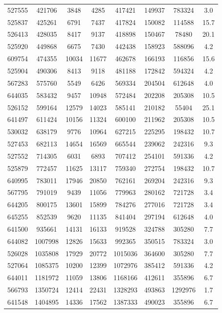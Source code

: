 \documentclass[DM,lsstdraft,toc,usenatbib]{lsstdoc}
\begin{document}
\begin{longtable}{cccccccc}
527555 & 421706 & 3848 & 4285 & 417421 & 149937 & 783324 & 3.0 \\
525837 & 425261 & 6791 & 7437 & 417824 & 150082 & 114588 & 15.7 \\
526413 & 428035 & 8417 & 9137 & 418898 & 150467 & 78480 & 20.1 \\
525920 & 449868 & 6675 & 7430 & 442438 & 158923 & 588096 & 4.2 \\
609754 & 474355 & 10034 & 11677 & 462678 & 166193 & 116856 & 15.6 \\
525904 & 490306 & 8413 & 9118 & 481188 & 172842 & 594324 & 4.2 \\
567283 & 575760 & 5549 & 6426 & 569334 & 204504 & 612648 & 4.0 \\
644035 & 583432 & 9457 & 10948 & 572484 & 202208 & 205308 & 10.5 \\
526152 & 599164 & 12579 & 14023 & 585141 & 210182 & 55404 & 25.1 \\
641497 & 611424 & 10156 & 11324 & 600100 & 211962 & 205308 & 10.5 \\
530032 & 638179 & 9776 & 10964 & 627215 & 225295 & 198432 & 10.7 \\
527453 & 682113 & 14654 & 16569 & 665544 & 239062 & 242316 & 9.3 \\
527552 & 714305 & 6031 & 6893 & 707412 & 254101 & 591336 & 4.2 \\
525879 & 772457 & 11625 & 13117 & 759340 & 272754 & 198432 & 10.7 \\
640995 & 783011 & 17946 & 20850 & 762161 & 269204 & 242316 & 9.3 \\
567795 & 791019 & 9439 & 11056 & 779963 & 280162 & 721728 & 3.4 \\
644205 & 800175 & 13601 & 15899 & 784276 & 277016 & 721728 & 3.4 \\
645255 & 852539 & 9620 & 11135 & 841404 & 297194 & 612648 & 4.0 \\
641500 & 935661 & 14131 & 16133 & 919528 & 324788 & 305280 & 7.7 \\
644082 & 1007998 & 12826 & 15633 & 992365 & 350515 & 783324 & 3.0 \\
526028 & 1035808 & 17929 & 20772 & 1015036 & 364600 & 305280 & 7.7 \\
527064 & 1085375 & 10200 & 12399 & 1072976 & 385412 & 591336 & 4.2 \\
644011 & 1181972 & 11059 & 13806 & 1168166 & 412611 & 355896 & 6.7 \\
566793 & 1350724 & 12414 & 22431 & 1328293 & 493863 & 1292976 & 1.7 \\
641548 & 1404895 & 14336 & 17562 & 1387333 & 490023 & 355896 & 6.7 \\

\end{longtable}
\end{document}
